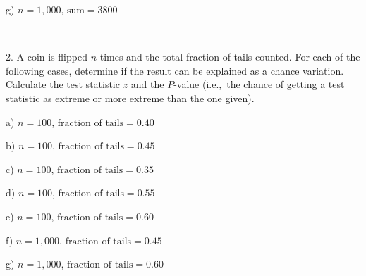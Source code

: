 \documentclass[10pt]{article}
\begin{document}
\hspace{20pt} g) $n=1,000$, $\mbox{sum}=3800$

\vfill
\eject
{\ }

2. A coin is flipped $n$ times and the total fraction of tails counted.
For each of the following cases, determine if the result can be explained as a chance
variation.  Calculate the test statistic $z$ and the $P$-value
(i.e.,~the chance of getting a test statistic 
  as extreme or more extreme than the one given).

\hspace{20pt} a) $n=100$, $\mbox{fraction of tails}=0.40$
\vspace{1.1in}

\hspace{20pt} b) $n=100$, $\mbox{fraction of tails}=0.45$
\vspace{1.1in}

\hspace{20pt} c) $n=100$, $\mbox{fraction of tails}=0.35$
\vspace{1.1in}

\hspace{20pt} d) $n=100$, $\mbox{fraction of tails}=0.55$
\vspace{1.1in}

\hspace{20pt} e) $n=100$, $\mbox{fraction of tails}=0.60$
\vspace{1.1in}

\hspace{20pt} f) $n=1,000$, $\mbox{fraction of tails}=0.45$
\vspace{1.1in}

\hspace{20pt} g) $n=1,000$, $\mbox{fraction of tails}=0.60$

\vfill
\eject
\end{document}
